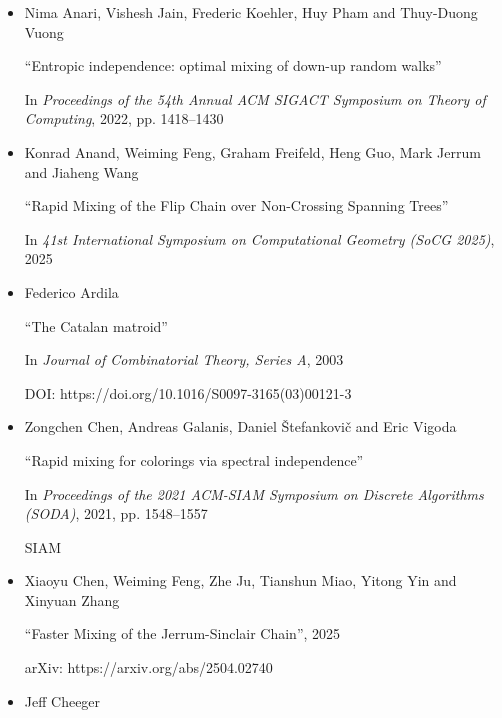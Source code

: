 \documentclass[10pt,a4paper]{article}
\begin{document}
\begin{itemize}
“$\lambda_{1}$, isoperimetric inequalities for graphs, and superconcentrators”

In \emph{Journal of Combinatorial Theory, Series B} \textbf{38.1}

Elsevier, 1985, pp. 73–88


      

\item[] [Ana+22]
Nima Anari, Vishesh Jain, Frederic Koehler, Huy Pham and Thuy-Duong Vuong

“Entropic independence: optimal mixing of down-up random walks”

In \emph{Proceedings of the 54th Annual ACM SIGACT Symposium on Theory of Computing}, 2022, pp. 1418–1430


      

\item[] [Ana+25]
Konrad Anand, Weiming Feng, Graham Freifeld, Heng Guo, Mark Jerrum and Jiaheng Wang

“Rapid Mixing of the Flip Chain over Non-Crossing Spanning Trees”

In \emph{41st International Symposium on Computational Geometry (SoCG 2025)}, 2025


      

\item[] [Ard03]
Federico Ardila

“The Catalan matroid”

In \emph{Journal of Combinatorial Theory, Series A}, 2003

DOI: https://doi.org/10.1016/S0097-3165(03)00121-3


      

\item[] [Che+21]
Zongchen Chen, Andreas Galanis, Daniel Štefankovič and Eric Vigoda

“Rapid mixing for colorings via spectral independence”

In \emph{Proceedings of the 2021 ACM-SIAM Symposium on Discrete Algorithms (SODA)}, 2021, pp. 1548–1557

SIAM


      

\item[] [Che+25]
Xiaoyu Chen, Weiming Feng, Zhe Ju, Tianshun Miao, Yitong Yin and Xinyuan Zhang

“Faster Mixing of the Jerrum-Sinclair Chain”, 2025

arXiv: https://arxiv.org/abs/2504.02740


      

\item[] [Che15]
Jeff Cheeger


\end{itemize}
\end{document}
